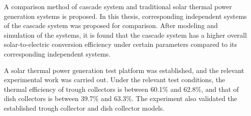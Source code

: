 {A comparison method of cascade system and traditional solar thermal power generation systems is proposed. In this thesis, corresponding independent systems of the cascade system was proposed for comparison. After modeling and simulation of the systems, it is found that the cascade system has a higher overall solar-to-electric conversion efficiency under certain parameters compared to its corresponding independent systems.

A solar thermal power generation test platform was established, and the relevant experimental work was carried out. Under the relevant test conditions, the thermal efficiency of trough collectors is between 60.1\% and 62.8\%, and that of dish collectors is between 39.7\% and 63.3\%. The experiment also validated the established trough collector and dish collector models.

%


}
